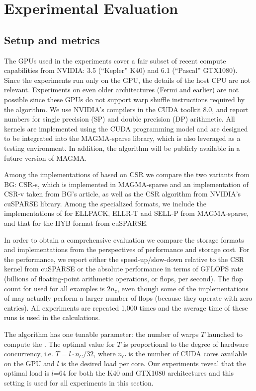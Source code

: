 \section{Experimental Evaluation}
\label{2017-csr-spmv:sec:results}

\subsection{Setup and metrics}

The GPUs used in the experiments cover a fair subset
of recent compute capabilities from NVIDIA:
3.5 (``Kepler'' K40) and 6.1 (``Pascal'' GTX1080).
Since the experiments run only on the GPU,
the details of the host CPU are not relevant.
Experiments on even older architectures (Fermi and earlier)
are not possible since these GPUs do not support warp shuffle instructions
required by the \bcsr algorithm.
We use NVIDIA's compilers in the CUDA toolkit 8.0,
and report numbers for single precision (SP)
and double precision (DP) arithmetic.
All kernels are implemented using the CUDA programming model
and are designed to be integrated
into the MAGMA-sparse library,
which is also leveraged as a testing environment.
In addition, the \bcsr algorithm will be publicly available
in a future version of MAGMA.

Among the implementations of \spmv based on CSR
we compare the two variants from BG:
CSR-s, which is implemented in MAGMA-sparse
and an implementation of CSR-v taken from BG's article,
as well as the CSR algorithm from NVIDIA's cuSPARSE library.
Among the specialized formats, we include the implementations of \spmv for
ELLPACK, ELLR-T and SELL-P from MAGMA-sparse,
and that for the HYB format from cuSPARSE.

In order to obtain a comprehensive evaluation
we compare the storage formats and \spmv implementations
from the perspectives of performance and storage cost.
For the performance, we report either the 
speed-up/slow-down relative to the CSR kernel from cuSPARSE
or the absolute performance in terms of GFLOPS rate
(billions of floating-point arithmetic operations, or flops, per second).
The flop count for \spmv used for all examples is $2n_z$,
even though some of the implementations of \spmv
may actually perform a larger number of flops
(because they operate with zero entries).
All experiments are repeated 1,000 times
and the average time of these runs is used in the calculations.

The \bcsr algorithm has one tunable parameter:
the number of warps $T$ launched to compute the \spmv.
The optimal value for $T$ is proportional to the degree of hardware concurrency,
i.e. $T = l \cdot n_C / 32$,
where $n_C$ is the number of CUDA cores available on the GPU
and $l$ is the desired load per core.
Our experiments reveal that the optimal load is $l$=64
for both the K40 and GTX1080 architectures
and this setting is used for all experiments in this section.

